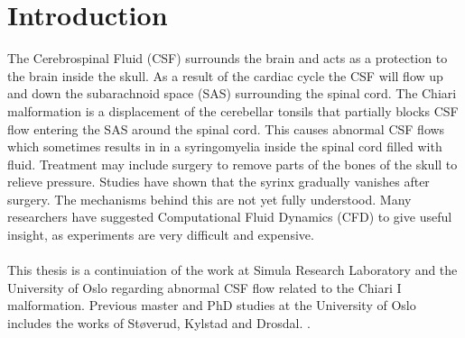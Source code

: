 \chapter{Introduction}
The Cerebrospinal Fluid (CSF) surrounds the brain and acts as a protection to the brain inside the skull. As a result of the cardiac cycle the CSF will flow up and down the subarachnoid space (SAS) surrounding the spinal cord. The Chiari malformation is a displacement of the cerebellar tonsils that partially blocks CSF flow entering the SAS around the spinal cord. This causes abnormal CSF flows which sometimes results in in a syringomyelia inside the spinal cord filled with fluid. Treatment may include surgery to remove parts of the bones of the skull to relieve pressure. Studies have shown that the syrinx gradually vanishes after surgery. The mechanisms behind this are not yet fully understood. Many researchers have suggested Computational Fluid Dynamics (CFD) to give useful insight, as experiments are very difficult and expensive. \\
\\
This thesis is a continuiation of the work at Simula Research Laboratory and the University of Oslo regarding abnormal CSF flow related to the Chiari I malformation. Previous master and PhD studies at the University of Oslo includes the works of St{\o}verud, Kylstad and Drosdal. \cite{Stov14} \cite{Kyls14} \cite{Dros11}. 

